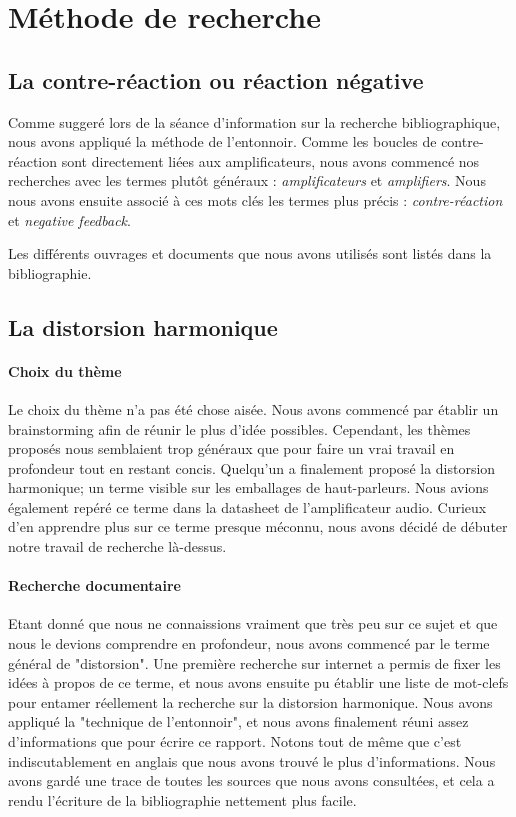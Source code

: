 

\section{Méthode de recherche}

\subsection{La contre-réaction ou réaction négative}
Comme suggeré lors de la séance d'information sur la recherche bibliographique,
nous avons appliqué la méthode de l'entonnoir. Comme les boucles de contre-réaction 
sont directement liées aux amplificateurs, nous avons commencé nos recherches avec 
les termes plutôt généraux : \textit{amplificateurs} et \textit{amplifiers}. Nous 
nous avons ensuite associé à ces mots clés les termes plus précis : \textit{contre-réaction}
et \textit{negative feedback}.

Les différents ouvrages et documents que nous avons utilisés sont listés dans la bibliographie.

\subsection{La distorsion harmonique}

\paragraph{Choix du thème}
Le choix du thème n'a pas été chose aisée. Nous avons commencé par établir un brainstorming afin de réunir 
le plus d'idée possibles. Cependant, les thèmes proposés nous semblaient trop généraux que pour faire un vrai 
travail en profondeur tout en restant concis. Quelqu'un a finalement proposé la distorsion harmonique; un 
terme visible sur les emballages de haut-parleurs. Nous avions également repéré ce terme dans la datasheet 
de l'amplificateur audio. Curieux d'en apprendre plus sur ce terme presque méconnu, 
nous avons décidé de débuter notre travail de recherche là-dessus.

\paragraph{Recherche documentaire}
Etant donné que nous ne connaissions vraiment que très peu sur ce sujet et que nous 
le devions comprendre en profondeur, nous avons commencé par le terme général de "distorsion".
Une première recherche sur internet a permis de fixer les idées à propos de ce terme, et nous 
avons ensuite pu établir une liste de mot-clefs pour entamer réellement la recherche sur la 
distorsion harmonique. Nous avons appliqué la "technique de l'entonnoir", et nous avons finalement 
réuni assez d'informations que pour écrire ce rapport. Notons tout de même que c'est indiscutablement
en anglais que nous avons 
trouvé le plus d'informations. Nous avons gardé une trace de toutes les sources que nous avons 
consultées, et cela a rendu l'écriture de la bibliographie nettement plus facile.


